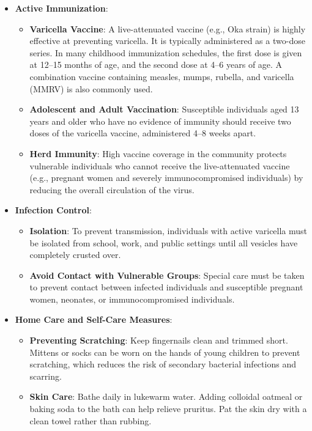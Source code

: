 \begin{itemize}
    \item \textbf{Active Immunization}:
    \begin{itemize}
        \item \textbf{Varicella Vaccine}: A live-attenuated vaccine (e.g., Oka strain) is highly effective at preventing varicella. It is typically administered as a two-dose series. In many childhood immunization schedules, the first dose is given at 12--15 months of age, and the second dose at 4--6 years of age. A combination vaccine containing measles, mumps, rubella, and varicella (MMRV) is also commonly used.
        \item \textbf{Adolescent and Adult Vaccination}: Susceptible individuals aged 13 years and older who have no evidence of immunity should receive two doses of the varicella vaccine, administered 4--8 weeks apart.
        \item \textbf{Herd Immunity}: High vaccine coverage in the community protects vulnerable individuals who cannot receive the live-attenuated vaccine (e.g., pregnant women and severely immunocompromised individuals) by reducing the overall circulation of the virus.
    \end{itemize}
    \item \textbf{Infection Control}:
    \begin{itemize}
        \item \textbf{Isolation}: To prevent transmission, individuals with active varicella must be isolated from school, work, and public settings until all vesicles have completely crusted over.
        \item \textbf{Avoid Contact with Vulnerable Groups}: Special care must be taken to prevent contact between infected individuals and susceptible pregnant women, neonates, or immunocompromised individuals.
    \end{itemize}
    \item \textbf{Home Care and Self-Care Measures}:
    \begin{itemize}
        \item \textbf{Preventing Scratching}: Keep fingernails clean and trimmed short. Mittens or socks can be worn on the hands of young children to prevent scratching, which reduces the risk of secondary bacterial infections and scarring.
        \item \textbf{Skin Care}: Bathe daily in lukewarm water. Adding colloidal oatmeal or baking soda to the bath can help relieve pruritus. Pat the skin dry with a clean towel rather than rubbing.

\end{itemize}
\end{itemize}
